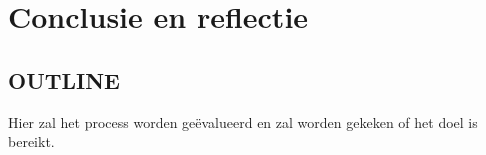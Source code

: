 \section{Conclusie en reflectie}

\subsection*{OUTLINE}
Hier zal het process worden geëvalueerd en zal worden gekeken of het doel is bereikt.

